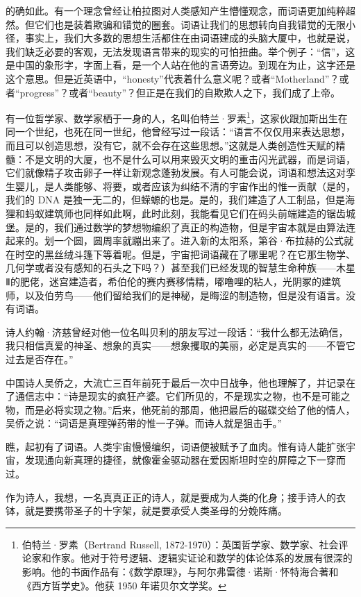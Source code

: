 \documentclass[AutoFakeBold=true]{book}
\begin{document}
的确如此。有一个理念曾经让柏拉图对人类感知产生懵懂观念，而词语更加纯粹超然。但它们也是装着欺骗和错觉的圈套。词语让我们的思想转向自我错觉的无限小径，事实上，我们大多数的思想生活都住在由词语建成的头脑大厦中，也就是说，我们缺乏必要的客观，无法发现语言带来的现实的可怕扭曲。举个例子：``信''，这是中国的象形字，字面上看，是一个人站在他的言语旁边。到现在为止，这字还是这个意思。但是近英语中，``honesty''代表着什么意义呢？或者``Motherland''？或者``progress''？或者``beauty''？但正是在我们的自欺欺人之下，我们成了上帝。

有一位哲学家、数学家栖于一身的人，名叫伯特兰·罗素\footnote{伯特兰·罗素（Bertrand Russell, 1872-1970）：英国哲学家、数学家、社会评论家和作家。他对于符号逻辑、逻辑实证论和数学的体论体系的发展有很深的影响。他的书面作品有：《数学原理》，与阿尔弗雷德·诺斯·怀特海合著和《西方哲学史》。他获 1950 年诺贝尔文学奖。}，这家伙跟加斯出生在同一个世纪，也死在同一世纪，他曾经写过一段话：``语言不仅仅用来表达思想，而且可以创造思想，没有它，就不会存在这些思想。''这就是人类创造性天赋的精髓：不是文明的大厦，也不是什么可以用来毁灭文明的重击闪光武器，而是词语，它们就像精子攻击卵子一样让新观念蓬勃发展。有人可能会说，词语和想法这对孪生婴儿，是人类能够、将要，或者应该为纠结不清的宇宙作出的惟一贡献（是的，我们的 DNA 是独一无二的，但蝾螈的也是。是的，我们建造了人工制品，但是海狸和蚂蚁建筑师也同样如此啊，此时此刻，我能看见它们在码头前端建造的锯齿城堡。是的，我们通过数学的梦想物编织了真正的构造物，但是宇宙本就是由算法连起来的。划一个圆，圆周率就蹦出来了。进入新的太阳系，第谷·布拉赫的公式就在时空的黑丝绒斗篷下等着呢。但是，宇宙把词语藏在了哪里呢？在它那生物学、几何学或者没有感知的石头之下吗？）甚至我们已经发现的智慧生命种族——木星Ⅱ的肥佬，迷宫建造者，希伯伦的赛内赛移情精，嘟噜哩的粘人，光阴冢的建筑师，以及伯劳鸟——他们留给我们的是神秘，是晦涩的制造物，但是没有语言。没有词语。

诗人约翰·济慈曾经对他一位名叫贝利的朋友写过一段话：``我什么都无法确信，我只相信真爱的神圣、想象的真实——想象攫取的美丽，必定是真实的——不管它过去是否存在。''

中国诗人吴侨之，大流亡三百年前死于最后一次中日战争，他也理解了，并记录在了通信志中：``诗是现实的疯狂产婆。它们所见的，不是现实之物，也不是可能之物，而是必将实现之物。''后来，他死前的那周，他把最后的磁碟交给了他的情人，吴侨之说：``词语是真理弹药带的惟一子弹。而诗人就是狙击手。''

瞧，起初有了词语。人类宇宙慢慢编织，词语便被赋予了血肉。惟有诗人能扩张宇宙，发现通向新真理的捷径，就像霍金驱动器在爱因斯坦时空的屏障之下一穿而过。

作为诗人，我想，一名真真正正的诗人，就是要成为人类的化身；接手诗人的衣钵，就是要携带圣子的十字架，就是要承受人类圣母的分娩阵痛。
\end{document}
